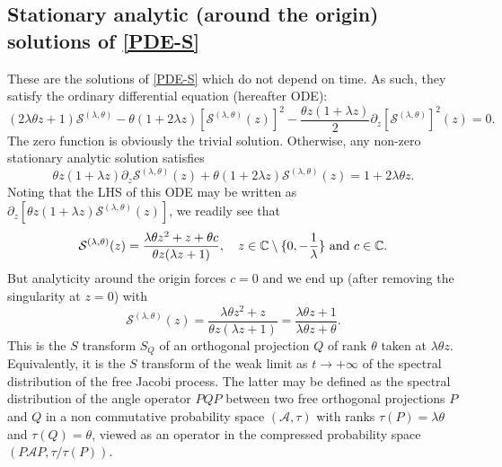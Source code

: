 \documentclass[12pt,reqno]{amsart}
\begin{document}
\subsection{Stationary analytic (around the origin) solutions of \texorpdfstring{\eqref{PDE-S}}{}} 
\label{ssec:stationnarysolution}
These are the solutions of \eqref{PDE-S} which do not depend on time. As such, they satisfy the ordinary differential equation (hereafter ODE):    
\begin{equation*}
(2\lambda \theta z+1) \mathcal{S}^{(\lambda,\theta)}
		-\theta (1+2\lambda z)[\mathcal{S}^{(\lambda,\theta)}(z)]^2 -\frac{\theta z (1+\lambda z)}{2}\partial_z[\mathcal{S}^{(\lambda,\theta)}]^2(z)=0.
\end{equation*}
The zero function is obviously the trivial solution. Otherwise, any non-zero stationary analytic solution satisfies
\begin{equation*}
\theta z (1+\lambda z)\partial_z\mathcal{S}^{(\lambda,\theta)}(z) + \theta (1+2\lambda z)\mathcal{S}^{(\lambda,\theta)}(z) = 1+ 2\lambda \theta z.
\end{equation*}
Noting that the LHS of this ODE may be written as $\partial_z[\theta z (1+\lambda z)\mathcal{S}^{(\lambda,\theta)}(z)]$, we readily see that 
\begin{equation*}
  \mathcal{S}^{(\lambda,\theta)}(z)=  \frac {\lambda\theta z^2 + z + \theta c} {\theta z (\lambda z + 1 )},\quad z\in \mathbb{C}\setminus\{0,-\frac{1}{\lambda}\}\ {\rm and}\ c\in\mathbb{C}. 
\end{equation*}
But analyticity around the origin forces $c = 0$ and we end up (after removing the singularity at $z=0$) with 
\begin{equation*}
  \mathcal{S}^{(\lambda,\theta)}(z)=  \frac {\lambda\theta z^2 +  z } {\theta z (\lambda z + 1 )} = \frac {\lambda\theta z +  1 } { \lambda\theta  z + \theta}.
\end{equation*}
This is the $S$ transform $S_Q$ of an orthogonal projection $Q$ of rank $\theta$ taken at $\lambda \theta z$.  Equivalently, it is the $S$ transform of the weak limit as $t \rightarrow +\infty$ of the spectral
distribution of the free Jacobi process.
The latter may be defined as the spectral distribution of the angle operator $PQP$ between two free orthogonal projections $P$ and $Q$ in a non commutative probability space $(\mathscr{A}, \tau)$ with ranks $\tau(P)= \lambda \theta$ and $\tau(Q) = \theta$, viewed as an operator in the compressed probability space $(P\mathscr{A}P, \tau/\tau(P))$. 
\end{document}
